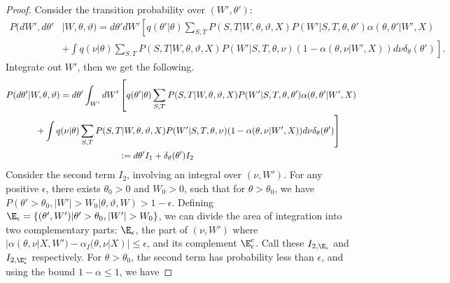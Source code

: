 \begin{proof}
Consider the transition probability over $(W',\theta')$:
\begin{align*}
  P(dW', d\theta'&| W, \theta, \vartheta) 
=d\theta' dW' \left[q(\theta' | \theta) 
  \sum_{S,T} P(S, T | W, \theta, \vartheta, X)P(W' | S, T, \theta, \theta')
\alpha(\theta, \theta' | W', X)\right. \\
&\left.+ \int q(\nu | \theta) \sum_{S,T} P(S, T|W,\theta,\vartheta,
    X)P(W' | S, T, \theta, \nu) ( 1 - {\alpha(\theta, \nu | W', X)})d\nu
    \delta_\theta(\theta')\right].
\end{align*}
Integrate out $W'$, then we get the following.
\begin{align*}
  P(d\theta'| W, \theta, \vartheta) =d\theta' \int_{W'}dW'&
  \left[q(\theta' | \theta)
    \sum_{S,T} P(S, T | W, \theta, \vartheta, X)P(W' | S, T, \theta,
  \theta')\alpha(\theta, \theta' | W', X)\right.\\
  &\hspace{-1.3in}\left.  + \int q(\nu | \theta) \sum_{S,T} P(S, T |  W, \theta, \vartheta,
X)P(W' | S, T, \theta, \nu) ( 1 - \alpha(\theta, \nu | W', X))d\nu
\delta_\theta(\theta')\right] \\
&:= d\theta' I_1 + \delta_\theta(\theta')I_2
\end{align*}
{Consider the second term $I_2$, involving an integral over $(\nu,W')$. 
 For any positive $\epsilon$, there exists $\theta_0 > 0$ and $W_0 > 0$, 
 such that for $\theta > \theta_0$, we have $P(\theta' > \theta_0, |W'| > 
 W_0 |\theta, \vartheta, W) > 1 - \epsilon$. Defining $\E_{\epsilon} = 
 \{ (\theta', W') | \theta' > \theta_0, |W'| > W_0\}$, we can divide the 
 area of integration into two complementary parts: $\E_{\epsilon}$, the 
 part of $(\nu,W')$ where 
  $|\alpha(\theta, \nu | X,W') - \alpha_I(\theta, \nu | X)| \le \epsilon$,
and its complement $\E^c_{\epsilon}$. Call these $I_{2,\E_{\epsilon}}$ and 
$I_{2,\E_{\epsilon}^c}$ respectively. 
For $\theta > \theta_0$, the second term has probability less than $\epsilon$, and using the bound 
$1-\alpha \le 1$, we have}

\end{proof}
